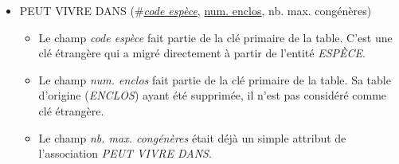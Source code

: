 \documentclass[a4paper]{article}
\newcommand{\relat}[1]{\textsc{#1}}
\newcommand{\attr}[1]{#1}
\newcommand{\prim}[1]{\uline{#1}}
\newcommand{\foreign}[1]{\#\textsl{#1}}
\begin{document}
\begin{itemize}
  \item \relat{PEUT VIVRE DANS} (\foreign{\prim{code espèce}}, \prim{num. enclos}, \attr{nb. max. congénères})
  \begin{itemize}
    \item Le champ \emph{code espèce} fait partie de la clé primaire de la table. C'est une clé étrangère qui a migré directement à partir de l'entité \emph{ESPÈCE}.
    \item Le champ \emph{num. enclos} fait partie de la clé primaire de la table. Sa table d'origine (\emph{ENCLOS}) ayant été supprimée, il n'est pas considéré comme clé étrangère.
    \item Le champ \emph{nb. max. congénères} était déjà un simple attribut de l'association \emph{PEUT VIVRE DANS}.
  \end{itemize}

\end{itemize}
\end{document}
